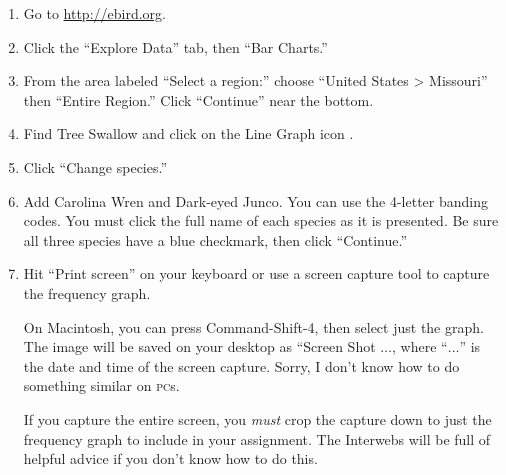\documentclass[12pt]{article}
\begin{document}
\begin{enumerate}
\item Go to \url{http://ebird.org}.

\item Click the “Explore Data” tab, then “Bar Charts.”


\item From the area labeled “Select a region:” choose “United States > Missouri” then “Entire Region.” Click “Continue” near the bottom.

\item Find Tree Swallow and click on the Line Graph icon .

\item Click “Change species.”

\item Add Carolina Wren and Dark-eyed Junco. You can use the 4-letter banding codes. You must click the full name of each species as it is presented. Be sure all three species have a blue checkmark, then click “Continue.”

\item Hit ``Print screen'' on your keyboard or use a screen capture tool to capture the frequency graph. \label{capture_step}

On Macintosh, you can press Command-Shift-4, then select just the graph. The image will be saved on your desktop as “Screen Shot $\dots$, where “$\dots$” is the date and time of the screen capture. Sorry, I don't know how to do something similar on \textsc{pc}s.

If you capture the entire screen, you \emph{must} crop the capture down to just the frequency graph  to include in your assignment. The Interwebs will be full of helpful advice if you don't know how to do this.

%
%
%
%


\end{enumerate}
\end{document}

